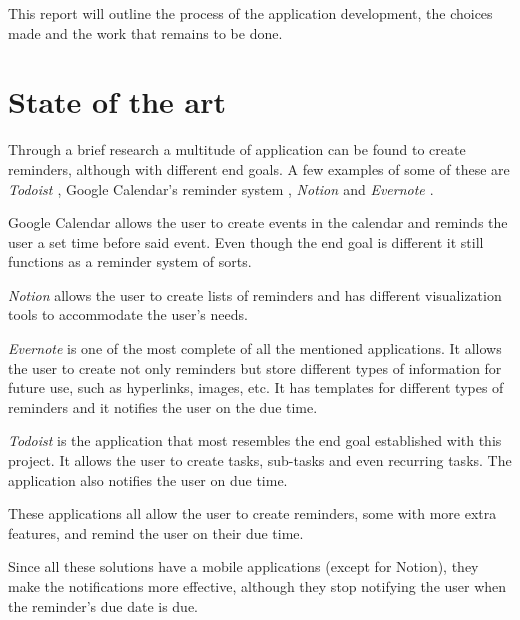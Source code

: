 This report will outline the process of the application development, the choices made and the work
that remains to be done.

\section{State of the art}

Through a brief research a multitude of application can be found to create reminders, although with different end goals. A few examples of some of these are \textit{Todoist \cite{todoist}}, Google Calendar's reminder system \cite{google-calendar}, \textit{Notion \cite{notion}} and \textit{Evernote \cite{evernote}}.


Google Calendar allows the user to create events in the calendar and reminds the user a set time before said event. Even though the end goal is different it still functions as a reminder system of sorts.

\textit{Notion} allows the user to create lists of reminders and has different visualization tools to accommodate the user's needs.

\textit{Evernote} is one of the most complete of all the mentioned applications. It allows the user to create not only reminders but store different types of information for future use, such as hyperlinks, images, etc. It has templates for different types of reminders and it notifies the user on the due time.

\textit{Todoist} is the application that most resembles the end goal established with this project. It allows the user to create tasks, sub-tasks and even recurring tasks. The application also notifies the user on due time.

These applications all allow the user to create reminders, some with more extra features, and remind the user on their due time.

Since all these solutions have a mobile applications (except for Notion), they make the notifications more effective, although they stop notifying the user when the reminder's due date is due.